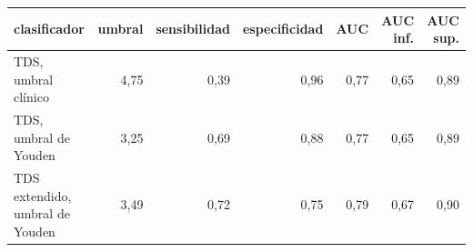\begin{tabular}{lrrrrrr}
\toprule
clasificador & umbral & sensibilidad & especificidad & AUC & AUC inf. & AUC sup. \\
\midrule
TDS, umbral clínico & 4{,}75 & 0{,}39 & 0{,}96 & 0{,}77 & 0{,}65 & 0{,}89 \\
TDS, umbral de Youden & 3{,}25 & 0{,}69 & 0{,}88 & 0{,}77 & 0{,}65 & 0{,}89 \\
TDS extendido, umbral de Youden & 3{,}49 & 0{,}72 & 0{,}75 & 0{,}79 & 0{,}67 & 0{,}90 \\
\bottomrule
\end{tabular}
